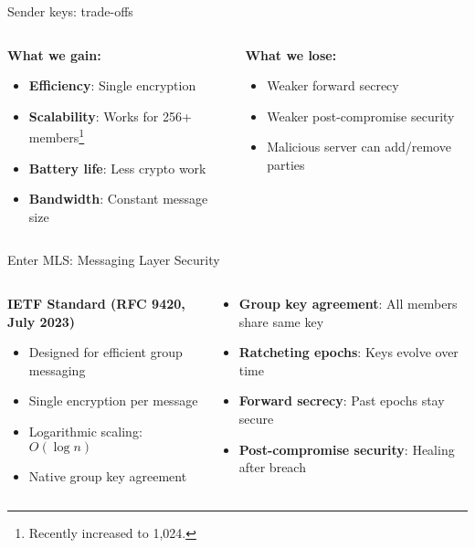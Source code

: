 \documentclass[aspectratio=169, lualatex, handout]{beamer}
\begin{document}
\begin{frame}{Sender keys: trade-offs}
	\begin{columns}[c]
		\begin{column}{0.5\textwidth}
			\textbf{What we gain:}
			\begin{itemize}
				\item \textbf{Efficiency}: Single encryption
				\item \textbf{Scalability}: Works for 256+ members\footnote{Recently increased to 1,024.}
				\item \textbf{Battery life}: Less crypto work
				\item \textbf{Bandwidth}: Constant message size
			\end{itemize}
		\end{column}
		\begin{column}{0.5\textwidth}
			\textbf{What we lose:}
			\begin{itemize}
				\item Weaker forward secrecy
				\item Weaker post-compromise security
				\item Malicious server can add/remove parties
			\end{itemize}
		\end{column}
	\end{columns}
\end{frame}

\begin{frame}{Enter MLS: Messaging Layer Security}
	\begin{columns}[c]
		\begin{column}{0.5\textwidth}
			\textbf{IETF Standard (RFC 9420, July 2023)}
			\begin{itemize}
				\item Designed for efficient group messaging
				\item Single encryption per message
				\item Logarithmic scaling: $O(\log n)$
				\item Native group key agreement
			\end{itemize}
		\end{column}
		\begin{column}{0.5\textwidth}
			\begin{itemize}
				\item \textbf{Group key agreement}: All members share same key
				\item \textbf{Ratcheting epochs}: Keys evolve over time
				\item \textbf{Forward secrecy}: Past epochs stay secure
				\item \textbf{Post-compromise security}: Healing after breach
			\end{itemize}
		\end{column}
	\end{columns}
\end{frame}
\end{document}
